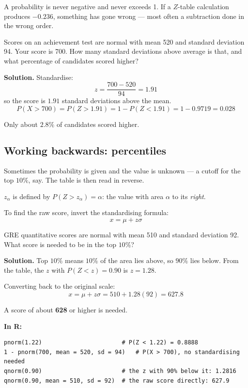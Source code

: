 \documentclass[a4paper,11pt]{article}
\newcommand{\Rc}{\textbf{\color{NavyBlue}In R:}\ }
\begin{document}
\begin{watchbox}
A probability is never negative and never exceeds 1. If a $Z$-table calculation
produces $-0.236$, something has gone wrong --- most often a subtraction done in
the wrong order.
\end{watchbox}

\begin{example}
Scores on an achievement test are normal with mean 520 and standard deviation
94. Your score is 700. How many standard deviations above average is that, and
what percentage of candidates scored higher?

\medskip
\textbf{Solution.} Standardise:
\[ z = \frac{700 - 520}{94} = 1.91 \]
so the score is $1.91$ standard deviations above the mean.
\[ P(X > 700) = P(Z > 1.91) = 1 - P(Z < 1.91) = 1 - 0.9719 = 0.028 \]

Only about $2.8\%$ of candidates scored higher.
\end{example}

\subsection*{Working backwards: percentiles}

Sometimes the probability is given and the value is unknown --- a cutoff for the
top $10\%$, say. The table is then read in reverse.

\begin{keybox}
$z_{\alpha}$ is defined by $P(Z > z_{\alpha}) = \alpha$: the value with area
$\alpha$ to its \emph{right}.

To find the raw score, invert the standardising formula:
\[ x = \mu + z\sigma \]
\end{keybox}

\begin{example}
GRE quantitative scores are normal with mean 510 and standard deviation 92. What
score is needed to be in the top $10\%$?

\medskip
\textbf{Solution.} Top $10\%$ means $10\%$ of the area lies above, so $90\%$
lies below. From the table, the $z$ with $P(Z < z) = 0.90$ is $z = 1.28$.

Converting back to the original scale:
\[ x = \mu + z\sigma = 510 + 1.28(92) = 627.8 \]

A score of about \textbf{628} or higher is needed.
\end{example}

\Rc
\begin{lstlisting}
pnorm(1.22)                       # P(Z < 1.22) = 0.8888
1 - pnorm(700, mean = 520, sd = 94)   # P(X > 700), no standardising needed
qnorm(0.90)                       # the z with 90% below it: 1.2816
qnorm(0.90, mean = 510, sd = 92)  # the raw score directly: 627.9
\end{lstlisting}
\end{document}
